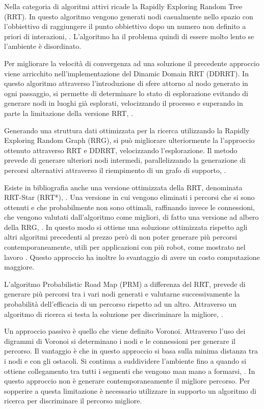Nella categoria di algoritmi attivi ricade la Rapidly Exploring Random Tree (RRT). In questo algoritmo vengono generati nodi casualmente nello spazio con l'obbiettivo di raggiungere il punto obbiettivo dopo un numero non definito a priori di interazioni, \cite{Lavalle98rapidly-exploringrandom}. L'algoritmo ha il problema quindi di essere molto lento se l'ambiente è disordinato.

Per migliorare la velocità di convergenza ad una soluzione il precedente approccio viene arricchito nell'implementazione del Dinamic Domain RRT (DDRRT). In questo algoritmo attraverso l'introduzione di sfere attorno al nodo generato in ogni passaggio, si permette di determinare lo stato di esplorazione evitando di generare nodi in luoghi già esplorati, velocizzando il processo e superando in parte la limitazione della versione RRT, \cite{YangLiang2016SoR3}.

Generando una struttura dati ottimizzata per la ricerca utilizzando la Rapidly Exploring Random Graph (RRG), si può migliorare ulteriormente la l'approccio ottenuto attraverso RRT e DDRRT, velocizzando l'esplorazione. Il metodo prevede di generare ulteriori nodi intermedi, parallelizzando la generazione di percorsi alternativi attraverso il riempimento di un grafo di supporto, \cite{doi:10.1080/01691864.2013.805472}.

Esiste in bibliografia anche una versione ottimizzata della RRT, denominata RRT-Star (RRT*), \cite{ChoudhurySanjiban2013RSar}. Una versione in cui vengono eliminati i percorsi che si sono ottenuti e che probabilmente non sono ottimali, raffinando invece le connessioni, che vengono valutati dall'algoritmo  come migliori, di fatto una versione ad albero della RRG, \cite{YangLiang2016SoR3}. In questo modo si ottiene una soluzione ottimizzata rispetto agli altri algoritmi precedenti al prezzo però di non poter generare più percorsi contemporaneamente, utili per applicazioni con più robot, come mostrato nel lavoro \cite{doi:10.1080/01691864.2013.805472}. Questo approccio ha inoltre lo svantaggio di avere un costo computazione maggiore.

L'algoritmo Probabilistic Road Map (PRM) a differenza del RRT, prevede di generare più percorsi tra i vari nodi generati e valutarne successivamente la probabilità dell'efficacia di un percorso rispetto ad un altro. Attraverso un algoritmo di ricerca si testa la soluzione per discriminare la migliore, \cite{KavrakiL1994Prfp}.

Un approccio passivo è quello che viene definito Voronoi. Attraverso l'uso dei digrammi di Voronoi si determinano i nodi e le connessioni per generare il percorso. Il vantaggio è che in questo approccio si basa sulla minima distanza tra i nodi e con gli ostacoli. Si continua a suddividere l'ambiente fino a quando si ottiene collegamento tra tutti i segmenti che vengono man mano a formarsi, \cite{LuchnikovVA1999Vaov}. In questo approccio non è generare contemporaneamente il migliore percorso. Per sopperire a questa limitazione è necessario utilizzare in supporto un algoritmo di ricerca per discriminare il percorso migliore.

